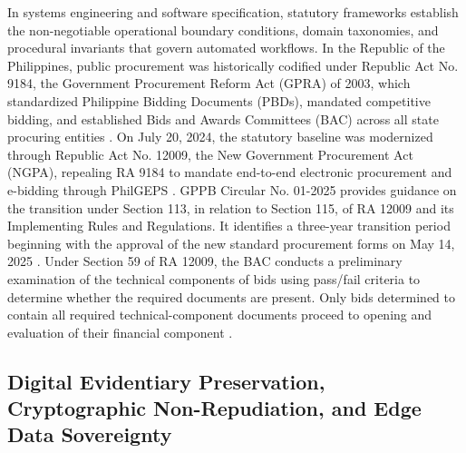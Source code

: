 In systems engineering and software specification, statutory frameworks establish the non-negotiable operational boundary conditions, domain taxonomies, and procedural invariants that govern automated workflows.
In the Republic of the Philippines, public procurement was historically codified under Republic Act No. 9184, the Government Procurement Reform Act (GPRA) of 2003, which standardized Philippine Bidding Documents (PBDs), mandated competitive bidding, and established Bids and Awards Committees (BAC) across all state procuring entities \cite{ref1}.
On July 20, 2024, the statutory baseline was modernized through Republic Act No. 12009, the New Government Procurement Act (NGPA), repealing RA 9184 to mandate end-to-end electronic procurement and e-bidding through PhilGEPS \cite{ref2}.
GPPB Circular No. 01-2025 provides guidance on the transition under Section 113, in relation to Section 115, of RA 12009 and its Implementing Rules and Regulations. It identifies a three-year transition period beginning with the approval of the new standard procurement forms on May 14, 2025 \cite{ref7}.
Under Section 59 of RA 12009, the BAC conducts a preliminary examination of the technical components of bids using pass/fail criteria to determine whether the required documents are present. Only bids determined to contain all required technical-component documents proceed to opening and evaluation of their financial component \cite{ra12009act}.

\subsection{Digital Evidentiary Preservation, Cryptographic Non-Repudiation, and Edge Data Sovereignty}

